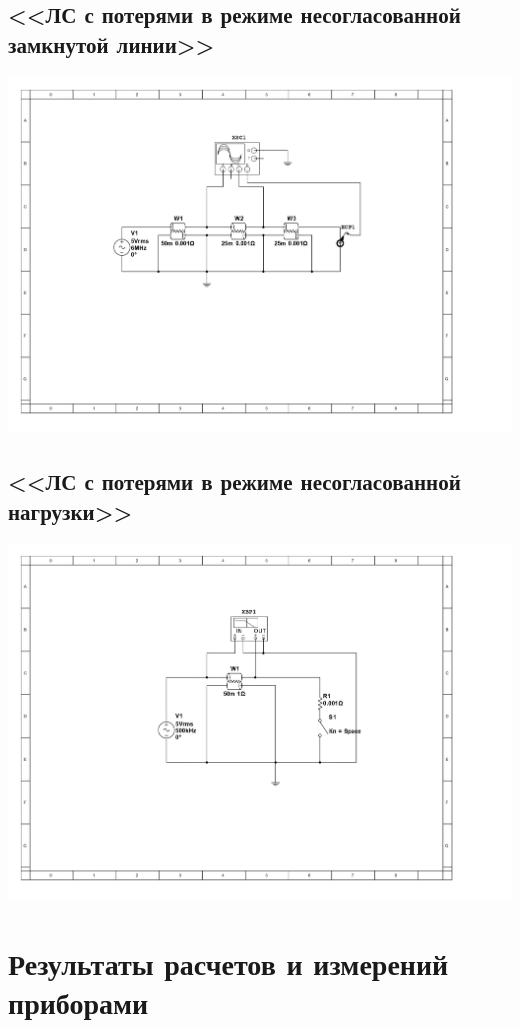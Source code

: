 \documentclass[11pt]{article}
\begin{document}
\subsection{<<ЛС с потерями в режиме несогласованной замкнутой линии>>}
\includegraphics[width=1\linewidth]{3/scheme.jpg}
\subsection{<<ЛС с потерями в режиме несогласованной нагрузки>>}
\includegraphics[width=1\linewidth]{4/scheme.jpg}
\section{Результаты расчетов и измерений приборами}
\end{document}
